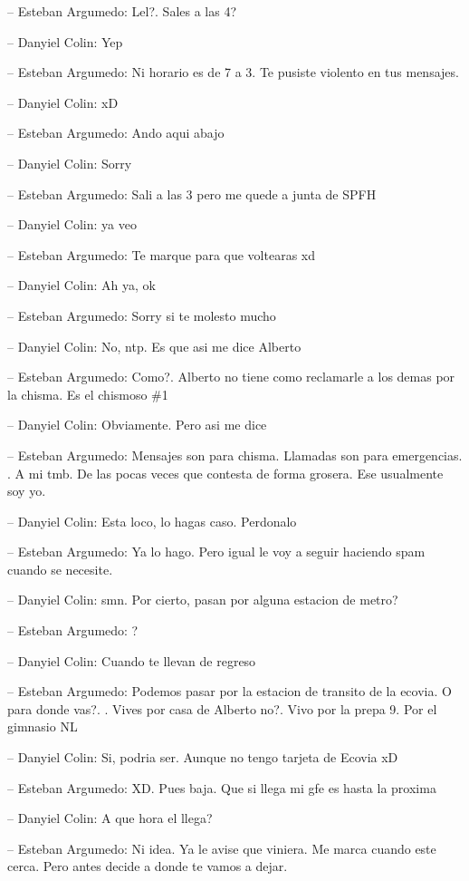 -- Esteban Argumedo: Lel?. Sales a las 4?

-- Danyiel Colin: Yep

-- Esteban Argumedo: Ni horario es de 7 a 3. Te pusiste violento en tus
mensajes.

-- Danyiel Colin: xD

-- Esteban Argumedo: Ando aqui abajo

-- Danyiel Colin: Sorry

-- Esteban Argumedo: Sali a las 3 pero me quede a junta de SPFH

-- Danyiel Colin: ya veo

-- Esteban Argumedo: Te marque para que voltearas xd

-- Danyiel Colin: Ah ya, ok

-- Esteban Argumedo: Sorry si te molesto mucho

-- Danyiel Colin: No, ntp. Es que asi me dice Alberto

-- Esteban Argumedo: Como?. Alberto no tiene como reclamarle a los demas
por la chisma. Es el chismoso \#1

-- Danyiel Colin: Obviamente. Pero asi me dice

-- Esteban Argumedo: Mensajes son para chisma. Llamadas son para
emergencias. . A mi tmb. De las pocas veces que contesta de forma
grosera. Ese usualmente soy yo.

-- Danyiel Colin: Esta loco, lo hagas caso. Perdonalo

-- Esteban Argumedo: Ya lo hago. Pero igual le voy a seguir haciendo
spam cuando se necesite.

-- Danyiel Colin: smn. Por cierto, pasan por alguna estacion de metro?

-- Esteban Argumedo: ?

-- Danyiel Colin: Cuando te llevan de regreso

-- Esteban Argumedo: Podemos pasar por la estacion de transito de la
ecovia. O para donde vas?. . Vives por casa de Alberto no?. Vivo por la
prepa 9. Por el gimnasio NL

-- Danyiel Colin: Si, podria ser. Aunque no tengo tarjeta de Ecovia xD

-- Esteban Argumedo: XD. Pues baja. Que si llega mi gfe es hasta la
proxima

-- Danyiel Colin: A que hora el llega?

-- Esteban Argumedo: Ni idea. Ya le avise que viniera. Me marca cuando
este cerca. Pero antes decide a donde te vamos a dejar.

